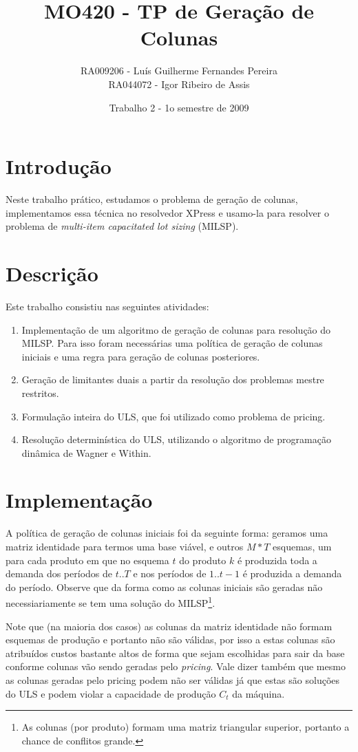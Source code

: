 \documentclass[letterpaper,11pt]{article}
\title{MO420 - TP de Geração de Colunas}
\author{RA009206 - Luís Guilherme Fernandes Pereira \\
RA044072 - Igor Ribeiro de Assis}
\date{Trabalho 2 - 1o semestre de 2009}
\begin{document}
\maketitle

\section{Introdução}

Neste trabalho prático, estudamos o problema de geração de colunas,
implementamos essa técnica no resolvedor XPress e usamo-la para resolver
o problema de \emph{multi-item capacitated lot sizing} (MILSP).

\section{Descrição}
Este trabalho consistiu nas seguintes atividades:

\begin{enumerate}
 \item Implementação de um algoritmo de geração de colunas para
       resolução do MILSP. Para isso foram necessárias uma política de 
       geração de colunas iniciais e uma regra para geração de colunas
       posteriores.
 \item Geração de limitantes duais a partir da resolução dos problemas
       mestre restritos.
 \item Formulação inteira do ULS, que foi utilizado como problema de
       pricing.
 \item Resolução determinística do ULS, utilizando o algoritmo de
       programação dinâmica de Wagner e Within. 
\end{enumerate}

\section{Implementação}
A política de geração de colunas iniciais foi da seguinte forma:
geramos uma matriz identidade para termos uma base viável, e outros
$M*T$ esquemas, um para cada produto em que no esquema $t$ do produto
$k$ é produzida toda a demanda dos períodos de $t..T$ e nos períodos
de $1..t-1$ é produzida a demanda do período. Observe que da forma
como as colunas iniciais são geradas não necessiariamente se tem uma
solução do MILSP\footnote{As colunas (por produto) formam uma matriz
  triangular superior, portanto a chance de conflitos grande.}.

Note que (na maioria dos casos) as colunas da matriz identidade não
formam esquemas de produção e portanto não são válidas, por isso a
estas colunas são atribuídos custos bastante altos de forma que sejam
escolhidas para sair da base conforme colunas vão sendo geradas pelo
\emph{pricing}. Vale dizer também que mesmo as colunas geradas pelo
pricing podem não ser válidas já que estas são soluções do ULS e podem
violar a capacidade de produção $C_t$ da máquina.
\end{document}
